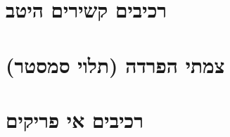 \documentclass[]{article}
\def\insert#1{}
\begin{document}
\section*{רכיבים קשירים היטב}
\insert{scc}

\section*{צמתי הפרדה (תלוי סמסטר)}
\insert{cut-vertex}

\section*{רכיבים אי פריקים}
\insert{block}
\end{document}
